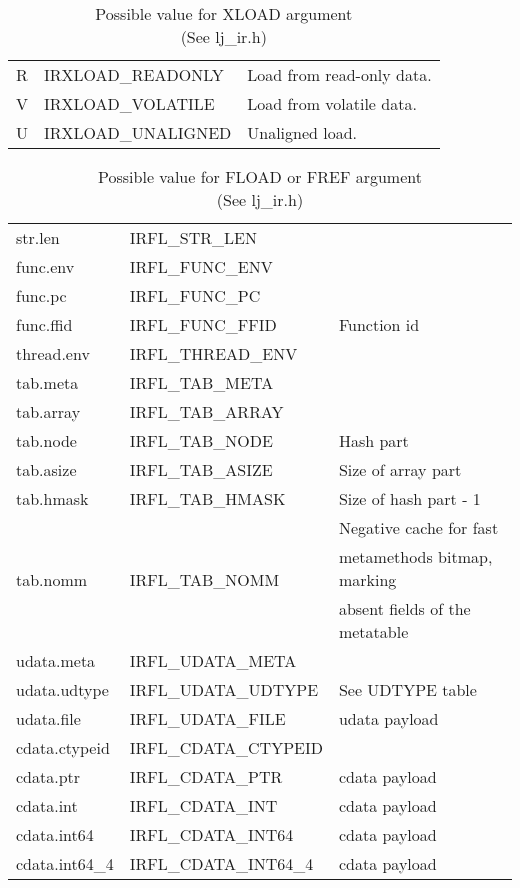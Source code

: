 \begin{table}
\centering
\begin{tabular}{|l|l|l|}
\hline
R & IRXLOAD\_READONLY  & Load from read-only data.\\
V & IRXLOAD\_VOLATILE  & Load from volatile data.\\
U & IRXLOAD\_UNALIGNED & Unaligned load.\\
\hline
\end{tabular}
\caption{
  Possible value for XLOAD argument \\(See lj\_ir.h)
}
\label{tab:dump-sload}
\end{table}
\begin{table}
\centering
\begin{tabular}{|l|l|l|}
\hline
str.len        & IRFL\_STR\_LEN        & \\
func.env       & IRFL\_FUNC\_ENV       & \\
func.pc        & IRFL\_FUNC\_PC        & \\
func.ffid      & IRFL\_FUNC\_FFID      & Function id\\
thread.env     & IRFL\_THREAD\_ENV     & \\
tab.meta       & IRFL\_TAB\_META       & \\
tab.array      & IRFL\_TAB\_ARRAY      & \\
tab.node       & IRFL\_TAB\_NODE       & Hash part\\
tab.asize      & IRFL\_TAB\_ASIZE      & Size of array part\\
tab.hmask      & IRFL\_TAB\_HMASK      & Size of hash part - 1\\
\multirow{3}{*}{tab.nomm} & \multirow{3}{*}{IRFL\_TAB\_NOMM} & Negative cache for fast \\
& & metamethods bitmap, marking\\
& & absent fields of the metatable\\
udata.meta     & IRFL\_UDATA\_META     & \\
udata.udtype   & IRFL\_UDATA\_UDTYPE   & See UDTYPE table\\
udata.file     & IRFL\_UDATA\_FILE     & udata payload \\
cdata.ctypeid  & IRFL\_CDATA\_CTYPEID  & \\
cdata.ptr      & IRFL\_CDATA\_PTR      & cdata payload \\
cdata.int      & IRFL\_CDATA\_INT      & cdata payload \\
cdata.int64    & IRFL\_CDATA\_INT64    & cdata payload \\
cdata.int64\_4 & IRFL\_CDATA\_INT64\_4 & cdata payload \\
\hline
\end{tabular}
\caption{
  Possible value for FLOAD or FREF argument \\(See lj\_ir.h)
}
\label{tab:dump-fload-fref}
\end{table}

